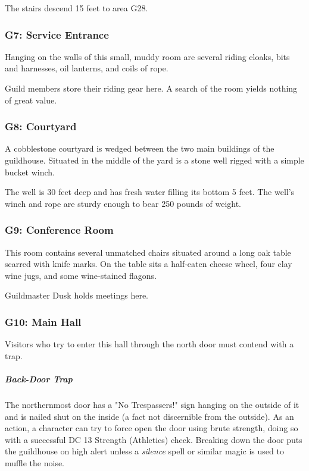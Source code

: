 \documentclass[10pt,a4paper,twoside,bg=print,twocolumn,openany,nodeprecatedcode]{dndbook}
\begin{document}
The stairs descend 15 feet to area G28.

\subsubsection{G7: Service Entrance}
\begin{DndReadAloud}{}
Hanging on the walls of this small, muddy room are several riding cloaks, bits and harnesses, oil lanterns, and coils of rope.

\end{DndReadAloud}

Guild members store their riding gear here. A search of the room yields nothing of great value.

\subsubsection{G8: Courtyard}
\begin{DndReadAloud}{}
A cobblestone courtyard is wedged between the two main buildings of the guildhouse. Situated in the middle of the yard is a stone well rigged with a simple bucket winch.

\end{DndReadAloud}

The well is 30 feet deep and has fresh water filling its bottom 5 feet. The well's winch and rope are sturdy enough to bear 250 pounds of weight.

\subsubsection{G9: Conference Room}
\begin{DndReadAloud}{}
This room contains several unmatched chairs situated around a long oak table scarred with knife marks. On the table sits a half-eaten cheese wheel, four clay wine jugs, and some wine-stained flagons.

\end{DndReadAloud}

Guildmaster Dusk holds meetings here.

\subsubsection{G10: Main Hall}
Visitors who try to enter this hall through the north door must contend with a trap.

\subparagraph{Back-Door Trap}
The northernmost door has a "No Trespassers!" sign hanging on the outside of it and is nailed shut on the inside (a fact not discernible from the outside). As an action, a character can try to force open the door using brute strength, doing so with a successful DC 13 Strength (Athletics) check. Breaking down the door puts the guildhouse on high alert unless a \textit{silence} spell or similar magic is used to muffle the noise.
\end{document}
